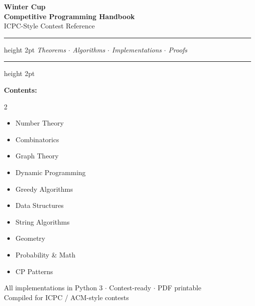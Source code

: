 \documentclass[10pt,a4paper]{article}
\theoremstyle{cpstyle}
\begin{document}
\begin{titlepage}
  \begin{center}
    \vspace*{2cm}
    {\Huge\bfseries\color{accent} Winter Cup}\\[0.5em]
    {\LARGE\bfseries Competitive Programming Handbook}\\[1em]
    {\large ICPC-Style Contest Reference}\\[3em]
    \hrule height 2pt
    \vspace{1em}
    {\large\itshape Theorems $\cdot$ Algorithms $\cdot$ Implementations $\cdot$ Proofs}\\[0.5em]
    \hrule height 2pt
    \vspace{3em}
    \begin{mdframed}[backgroundcolor=theorembg, linecolor=accent, linewidth=2pt,
      innerleftmargin=20pt, innerrightmargin=20pt, innertopmargin=16pt, innerbottommargin=16pt]
    \textbf{Contents:}
    \begin{multicols}{2}
    \begin{itemize}[noitemsep]
      \item[\S1] Number Theory
      \item[\S2] Combinatorics
      \item[\S3] Graph Theory
      \item[\S4] Dynamic Programming
      \item[\S5] Greedy Algorithms
      \item[\S6] Data Structures
      \item[\S7] String Algorithms
      \item[\S8] Geometry
      \item[\S9] Probability \& Math
      \item[\S10] CP Patterns
    \end{itemize}
    \end{multicols}
    \end{mdframed}
    \vfill
    {\small All implementations in Python 3 $\cdot$ Contest-ready $\cdot$ PDF printable}\\[0.5em]
    {\small\color{gray} Compiled for ICPC / ACM-style contests}
  \end{center}
\end{titlepage}

\setcounter{tocdepth}{2}
\tableofcontents
\clearpage
\end{document}
